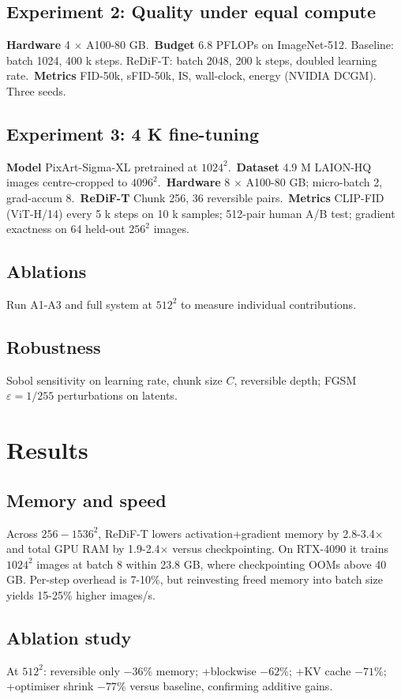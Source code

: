 \documentclass{article}
\begin{document}
\subsection{Experiment 2: Quality under equal compute}
\textbf{Hardware} 4 \(\times\) A100-80 GB.\
\textbf{Budget} 6.8 PFLOPs on ImageNet-512. Baseline: batch 1024, 400 k steps. ReDiF-T: batch 2048, 200 k steps, doubled learning rate.\
\textbf{Metrics} FID-50k, sFID-50k, IS, wall-clock, energy (NVIDIA DCGM). Three seeds.
\subsection{Experiment 3: 4 K fine-tuning}
\textbf{Model} PixArt-Sigma-XL pretrained at \(1024^2\).\
\textbf{Dataset} 4.9 M LAION-HQ images centre-cropped to \(4096^2\).\
\textbf{Hardware} 8 \(\times\) A100-80 GB; micro-batch 2, grad-accum 8.\
\textbf{ReDiF-T} Chunk 256, 36 reversible pairs.\
\textbf{Metrics} CLIP-FID (ViT-H/14) every 5 k steps on 10 k samples; 512-pair human A/B test; gradient exactness on 64 held-out \(256^2\) images.
\subsection{Ablations}
Run A1-A3 and full system at \(512^2\) to measure individual contributions.
\subsection{Robustness}
Sobol sensitivity on learning rate, chunk size \(C\), reversible depth; FGSM \(\varepsilon = 1/255\) perturbations on latents.

\section{Results}
\subsection{Memory and speed}
Across \(256-1536^2\), ReDiF-T lowers activation+gradient memory by 2.8-3.4\(\times\) and total GPU RAM by 1.9-2.4\(\times\) versus checkpointing. On RTX-4090 it trains \(1024^2\) images at batch 8 within 23.8 GB, where checkpointing OOMs above 40 GB. Per-step overhead is 7-10\%, but reinvesting freed memory into batch size yields 15-25\% higher images/s.
\subsection{Ablation study}
At \(512^2\): reversible only \(-36\%\) memory; +blockwise \(-62\%\); +KV cache \(-71\%\); +optimiser shrink \(-77\%\) versus baseline, confirming additive gains.
\end{document}
